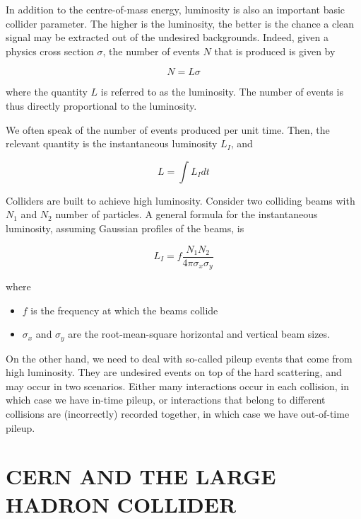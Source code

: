 In addition to the centre-of-mass energy, luminosity is also an important basic
collider parameter. The higher is the luminosity, the better is the chance a
clean signal may be extracted out of the undesired backgrounds. Indeed, given a
physics cross section $\sigma$, the number of events $N$ that is produced is
given by

$$N  = L \sigma$$

where the quantity $L$ is referred to as the luminosity. The number of events
is thus directly proportional to the luminosity.

We often speak of the number of events produced per unit time. Then, the
relevant quantity is the instantaneous luminosity $L_I$, and

$$ L = \int L_I dt $$

Colliders are built to achieve high luminosity. Consider two colliding beams
with $N_1$ and $N_2$ number of particles. A general formula for the
instantaneous luminosity, assuming Gaussian profiles of the beams, is

$$L_I = f \frac{N_1N_2}{4\pi \sigma_x\sigma_y} $$

where

\begin{itemize}
	\item $f$ is the frequency at which the beams collide

	\item $\sigma_x$ and $\sigma_y$ are the root-mean-square horizontal and
	      vertical beam sizes.

\end{itemize}

On the other hand, we need to deal with so-called pileup events that come from
high luminosity. They are undesired events on top of the hard scattering, and
may occur in two scenarios. Either many interactions occur in each collision,
in which case we have in-time pileup, or interactions that belong to different
collisions are (incorrectly) recorded together, in which case we have
out-of-time pileup.


\section{CERN AND THE LARGE HADRON COLLIDER}


